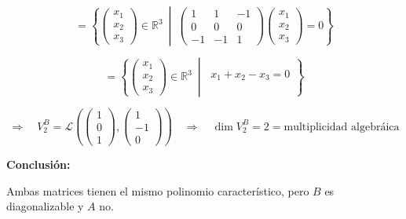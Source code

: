 \documentclass[12pt]{article}
\begin{document}
\begin{ejercicio}[2 puntos]
		\[
		= \left\{
		\begin{pmatrix}
			x_1 \\
			x_2 \\
			x_3
		\end{pmatrix}
		\in \mathbb{R}^3 \ \middle| \
		\begin{pmatrix}
			1 & 1 & -1 \\
			0 & 0 & 0 \\
			-1 & -1 & 1
		\end{pmatrix}
		\begin{pmatrix}
			x_1 \\
			x_2 \\
			x_3
		\end{pmatrix}
		= 0
		\right\}
		\]
		
		\[
		= \left\{
		\begin{pmatrix}
			x_1 \\
			x_2 \\
			x_3
		\end{pmatrix}
		\in \mathbb{R}^3 \ \middle| \
		\begin{array}{l}
			x_1 + x_2 - x_3 = 0 \\
		\end{array}
		\right\}
		\]
		
		\[
		\Rightarrow \quad V_2^B = \mathcal{L} \left(
		\begin{pmatrix}
			1 \\ 0 \\ 1
		\end{pmatrix},
		\begin{pmatrix}
			1 \\ -1 \\ 0
		\end{pmatrix}
		\right)
		\quad \Rightarrow \quad \dim V_2^B = 2 = \text{multiplicidad algebráica}
		\]
		
		\bigskip
		
		\textbf{Conclusión:}
		
		Ambas matrices tienen el mismo polinomio característico, pero \( B \) es diagonalizable y \( A \) no.
	\end{ejercicio}
	
\end{document}
